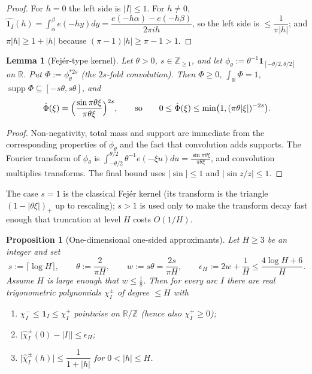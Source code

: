 \documentclass[11pt]{article}
\newtheorem{lemma}[theorem]{Lemma}
\newtheorem{proposition}[theorem]{Proposition}
\theoremstyle{definition}
\theoremstyle{plain}
\begin{document}
\begin{proof}
For $h=0$ the left side is $|I|\le1$.  For $h\ne0$,
$\widehat{\mathbf 1_{I}}(h)=\int_{\alpha}^{\beta}e(-hy)dy
=\dfrac{e(-h\alpha)-e(-h\beta)}{2\pi ih}$, so the left side is
$\le\dfrac{1}{\pi|h|}$; and $\pi|h|\ge1+|h|$ because
$(\pi-1)|h|\ge\pi-1>1$.
\end{proof}

\begin{lemma}[Fej\'er-type kernel]\label{lem:kernel}
Let $\theta>0$, $s\in\mathbb Z_{\ge1}$, and let
$\phi_{\theta}:=\theta^{-1}\mathbf 1_{[-\theta/2,\theta/2]}$ on
$\mathbb R$.  Put $\Phi:=\phi_{\theta}^{*2s}$ (the $2s$-fold convolution).
Then $\Phi\ge0$, $\int_{\mathbb R}\Phi=1$,
$\operatorname{supp}\Phi\subseteq[-s\theta,s\theta]$, and
\[
\hat\Phi(\xi)=\Bigl(\frac{\sin\pi\theta\xi}{\pi\theta\xi}\Bigr)^{2s},
\qquad\text{so}\qquad
0\le\hat\Phi(\xi)\le\min\bigl(1,(\pi\theta|\xi|)^{-2s}\bigr).
\]
\end{lemma}

\begin{proof}
Non-negativity, total mass and support are immediate from the
corresponding properties of $\phi_{\theta}$ and the fact that
convolution adds supports.  The Fourier transform of $\phi_{\theta}$ is
$\int_{-\theta/2}^{\theta/2}\theta^{-1}e(-\xi u)du
=\frac{\sin\pi\theta\xi}{\pi\theta\xi}$, and convolution multiplies
transforms.  The final bound uses $|\sin|\le1$ and $|\sin z/z|\le1$.
\end{proof}

The case $s=1$ is the classical Fej\'er kernel (its transform is the
triangle $(1-|\theta\xi|)_{+}$ up to rescaling); $s>1$ is used only to
make the transform decay fast enough that truncation at level $H$ costs
$O(1/H)$.

\begin{proposition}[One-dimensional one-sided approximants]
\label{prop:onesided}
Let $H\ge3$ be an integer and set
\[
s:=\lceil\log H\rceil,\qquad \theta:=\frac{2}{\pi H},\qquad
w:=s\theta=\frac{2s}{\pi H},\qquad
\epsilon_{H}:=2w+\frac1H\le\frac{4\log H+6}{H}.
\]
Assume $H$ is large enough that $w\le\tfrac18$.  Then for every arc $I$
there are real trigonometric polynomials $\chi^{\pm}_{I}$ of degree
$\le H$ with
\begin{enumerate}
\item[(i)] $\chi^{-}_{I}\le\mathbf 1_{I}\le\chi^{+}_{I}$ pointwise on
$\mathbb R/\mathbb Z$ (hence also $\chi^{+}_{I}\ge0$);
\item[(ii)] $\bigl|\hat\chi^{\pm}_{I}(0)-|I|\bigr|\le\epsilon_{H}$;
\item[(iii)] $\bigl|\hat\chi^{\pm}_{I}(h)\bigr|\le\dfrac{1}{1+|h|}$ for
$0<|h|\le H$.
\end{enumerate}
\end{proposition}
\end{document}
